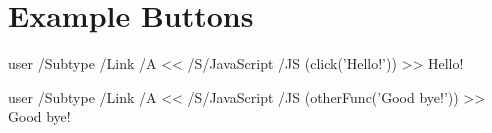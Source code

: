 \documentclass{article}
\begin{document}
\section{Example Buttons}

\leavevmode
\pdfstartlink user {
    /Subtype /Link
    /A <<
        /S/JavaScript
        /JS (click('Hello!'))
    >>
}Hello!\pdfendlink

\leavevmode
\pdfstartlink user {
    /Subtype /Link
    /A <<
        /S/JavaScript
        /JS (otherFunc('Good bye!'))
    >>
}Good bye!\pdfendlink
\end{document}

